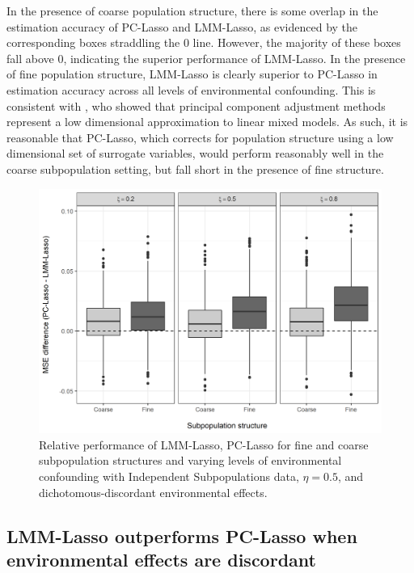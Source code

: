 In the presence of coarse population structure, there is some overlap in the estimation accuracy of PC-Lasso and LMM-Lasso, as evidenced by the corresponding boxes straddling the 0 line. However, the majority of these boxes fall above 0, indicating the superior performance of LMM-Lasso. In the presence of fine population structure, LMM-Lasso is clearly superior to PC-Lasso in estimation accuracy across all levels of environmental confounding. This is consistent with \citet{hoffman2013correcting}, who showed that principal component adjustment methods represent a low dimensional approximation to linear mixed models. As such, it is reasonable that PC-Lasso, which corrects for population structure using a low dimensional set of surrogate variables, would perform reasonably well in the coarse subpopulation setting, but fall short in the presence of fine structure. 
\begin{figure}[H]
    \centering
     \includegraphics[scale = 0.9]{figures/mse_diff_subpops.png}
    \caption{Relative performance of LMM-Lasso, PC-Lasso for fine and coarse subpopulation structures and varying levels of environmental confounding with Independent Subpopulations data, $\eta = 0.5$, and dichotomous-discordant environmental effects.}
    \label{fig:big_vs_small}
\end{figure}


\subsection{LMM-Lasso outperforms PC-Lasso when environmental effects are discordant}

